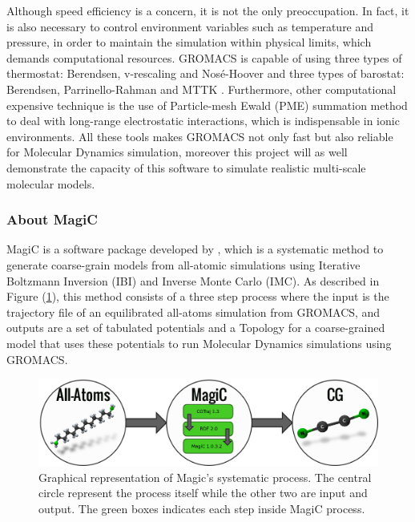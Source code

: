 \documentclass[10pt,a4paper,twoside]{article}
\begin{document}
Although speed efficiency is a concern, it is not the only preoccupation. In fact, it is also necessary to control environment variables such as temperature and pressure, in order to maintain the simulation within physical limits, which demands computational resources. GROMACS is capable of using three types of thermostat: Berendsen, v-rescaling and Nosé-Hoover and three types of barostat: Berendsen, Parrinello-Rahman and MTTK \cite{gromanual}. Furthermore, other computational expensive technique is the use of Particle-mesh Ewald (PME) summation method \cite{ewald} to deal with long-range electrostatic interactions, which is indispensable in ionic environments. All these tools makes GROMACS not only fast but also reliable for Molecular Dynamics simulation, moreover this project will as well demonstrate the capacity of this software to simulate realistic multi-scale molecular models.
  
\subsubsection{About MagiC}
\label{subsubsec:magic}
MagiC is a software package developed by , which is a systematic method to generate coarse-grain models from all-atomic simulations using Iterative Boltzmann Inversion (IBI) and Inverse Monte Carlo (IMC). As described in Figure (\ref{Fig:magic}), this method consists of a three step process where the input is the trajectory file of an equilibrated all-atoms simulation from GROMACS, and outputs are a set of tabulated potentials and a Topology for a coarse-grained model that uses these potentials to run Molecular Dynamics simulations using GROMACS. 
 \begin{figure}[ht]
  \begin{center}
	\includegraphics[width=1 \textwidth]{./images/magic}
	\caption{Graphical representation of Magic's systematic process. The central circle represent the process itself while the other two are input and output. The green boxes indicates each step inside MagiC process. }
	\label{Fig:magic}
	\end{center}
	\end{figure}
\end{document}
